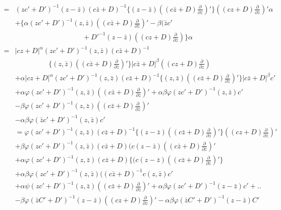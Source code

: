 {\fontsize{9pt}{11pt}\selectfont
\begin{align*}
= & (zc'+D')^{-1}(z-\bar{z})(c\bar{z}+D)^{-1}
\bigg\{(z-\bar{z})((c\bar{z}+D)\frac{\partial}{\partial
  \bar{z}})'\bigg \}((cz+D)\frac{\partial}{\partial \bar{z}})'\alpha
\\ 
& +\bigg \{
\alpha(zc'+D')^{-1}(z,\bar{z})((c\bar{z}+D)\frac{\partial}{\partial
  \bar{z}})'-\beta
(\bar{z}c' \\
& \hspace{4cm} +D'^{-1}(z-\bar{z})((cz+D)\frac{\partial}{\partial
  \bar{z}})\bigg\}\alpha \\ 
= & |cz+D|^\alpha (zc'+D')^{-1}(z,\bar{z})(c\bar{z}+D)^{-1}\\
& \hspace{2cm} \bigg \{
(z,\bar{z})((c\bar{z}+D)\frac{\partial}{\partial \bar{z}})'\bigg
\}|c\bar{z}+D|^\beta ((cz+D) \frac{\partial}{\partial z})\\  
& +\alpha |cz+D|^\alpha (zc'+D')^{-1}(z,\bar{z})(c\bar{z}+D)^{-1}
\bigg \{ (z,\bar{z})((c\bar{z}+D)\frac{\partial}{\partial
  \bar{z}})'\bigg \}|c\bar{z}+D|^\beta c'\\ 
& + \alpha \varphi
(zc'+D')^{-1}(z,\bar{z})((c\bar{z}+D)\frac{\partial}{\partial
  \bar{z}})'+\alpha \beta \varphi (zc'+D')^{-1}(z,\bar{z})c'\\ 
& - \beta \varphi
(zc'+D')^{-1}(z,\bar{z})((c\bar{z}+D)\frac{\partial}{\partial
  \bar{z}})'\\ 
& - \alpha \beta \varphi (\bar{z}c'+D')^{-1}(z,\bar{z})c'\\ 
& = \varphi (zc'+D')^{-1}(z,\bar{z})(c\bar{z}+D)^{-1}\bigg
\{(z-\bar{z})((c\bar{z}+D)\frac{\partial}{\partial \bar{z}})'\bigg
\}((cz+D)\frac{\partial}{\partial \bar{z}})'\\ 
& + \beta \varphi (zc'+D')^{-1}(z,\bar{z})(c\bar{z}+D)(c
(z-\bar{z})((c\bar{z}+D)\frac{\partial}{\partial \bar{z}})'\\ 
& + \alpha \varphi (zc'+D')^{-1}(z,\bar{z})(c\bar{z}+D)\bigg \{(c
(z-\bar{z})((c\bar{z}+D)\frac{\partial}{\partial \bar{z}})'\bigg \}\\ 
& + \alpha \beta \varphi
(zc'+D')^{-1}(z,\bar{z})((c\bar{z}+D)^{-1}c(z,\bar{z})c'\\ 
& + \alpha \psi
(zc'+D')^{-1}(z,\bar{z})((c\bar{z}+D)\frac{\partial}{\partial
  \bar{z}})' 
 + \alpha \beta \varphi (z c' + D' ) ^{-1} (z - \bar{z}) c' + .. \\
& - \beta \varphi (\bar{z} C' + D' )^{-1} (z - \bar{z}) ((c z + D )
\frac{\partial}{\partial z })' 
 -\alpha  \beta \varphi (\bar{z} C' + D' )^{-1} (z - \bar{z}) C' 
\end{align*}}\pageoriginale

